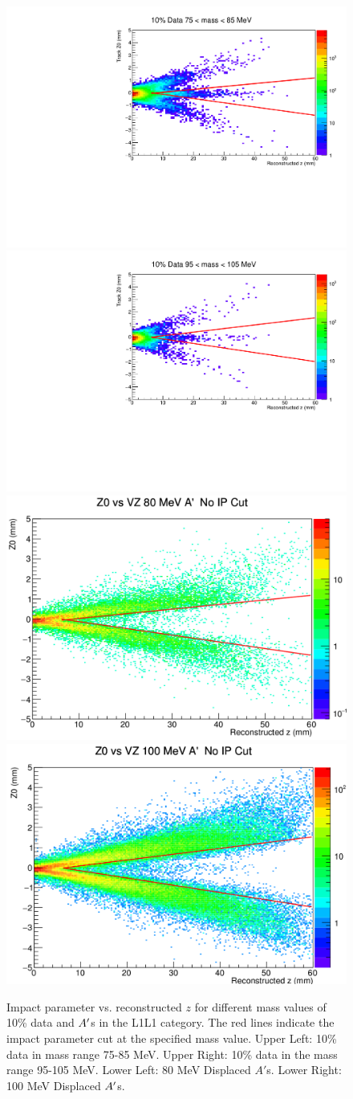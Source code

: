 \begin{figure}[t]
    \centering
    \includegraphics[width=.45\textwidth]{figs/selection/data_L1L1_80MeV_IP.pdf}
    \includegraphics[width=.45\textwidth]{figs/selection/data_L1L1_100MeV_IP.pdf}
    \includegraphics[width=.45\textwidth]{figs/selection/80MeV_L1L1_IP.png}
    \includegraphics[width=.45\textwidth]{figs/selection/100MeV_L1L1_IP.png}
    \caption{Impact parameter vs. reconstructed $z$ for different mass values of 10\% data and $A^\prime$s in the L1L1 category. The red lines indicate the impact parameter cut at the specified mass value. Upper Left: 10\% data in mass range 75-85 MeV. Upper Right: 10\% data in the mass range 95-105 MeV. Lower Left: 80 MeV Displaced $A'$s. Lower Right: 100 MeV Displaced $A^\prime$s.}
    \label{fig:z0_plots}
\end{figure}

